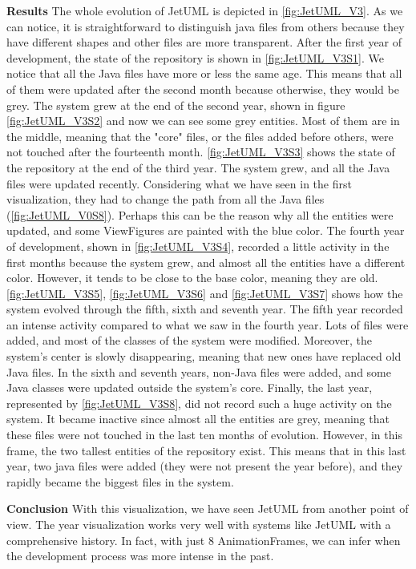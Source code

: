 \textbf{Results}
The whole evolution of JetUML is depicted in \autoref{fig:JetUML_V3}. As we can notice, it is straightforward to distinguish java files from others because they have different shapes and other files are more transparent. After the first year of development, the state of the repository is shown in \autoref{fig:JetUML_V3S1}. We notice that all the Java files have more or less the same age. This means that all of them were updated after the second month because otherwise, they would be grey. The system grew at the end of the second year, shown in figure \autoref{fig:JetUML_V3S2} and now we can see some grey entities. Most of them are in the middle, meaning that the "core" files, or the files added before others, were not touched after the fourteenth month.  \autoref{fig:JetUML_V3S3} shows the state of the repository at the end of the third year. The system grew, and all the Java files were updated recently. Considering what we have seen in the first visualization, they had to change the path from all the Java files (\autoref{fig:JetUML_V0S8}). Perhaps this can be the reason why all the entities were updated, and some ViewFigures are painted with the blue color. The fourth year of development, shown in  \autoref{fig:JetUML_V3S4}, recorded a little activity in the first months because the system grew, and almost all the entities have a different color. However, it tends to be close to the base color, meaning they are old. 
\autoref{fig:JetUML_V3S5},  \autoref{fig:JetUML_V3S6} and  \autoref{fig:JetUML_V3S7} shows how the system evolved through the fifth, sixth and seventh year. The fifth year recorded an intense activity compared to what we saw in the fourth year. Lots of files were added, and most of the classes of the system were modified. Moreover, the system's center is slowly disappearing, meaning that new ones have replaced old Java files. In the sixth and seventh years, non-Java files were added, and some Java classes were updated outside the system's core. Finally, the last year, represented by \autoref{fig:JetUML_V3S8}, did not record such a huge activity on the system. It became inactive since almost all the entities are grey, meaning that these files were not touched in the last ten months of evolution. However, in this frame, the two tallest entities of the repository exist. This means that in this last year, two java files were added (they were not present the year before), and they rapidly became the biggest files in the system.  

\textbf{Conclusion}
With this visualization, we have seen JetUML from another point of view. The year visualization works very well with systems like JetUML with a comprehensive history. In fact, with just 8 AnimationFrames, we can infer when the development process was more intense in the past. 


